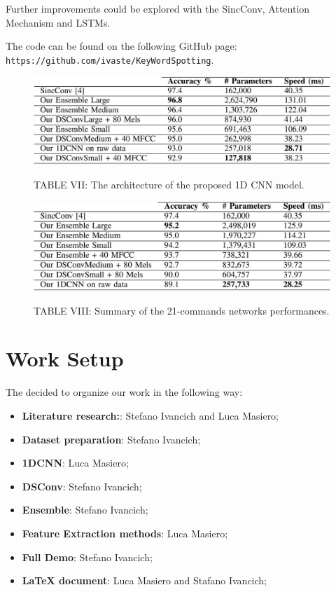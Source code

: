 \documentclass[conference]{IEEEtran}
\begin{document}
Further improvements could be explored with the SincConv, Attention Mechanism and LSTMs.

The code can be found on the following GitHub page: \texttt{https://github.com/ivaste/KeyWordSpotting}.

\begin{figure}
\centering
\includegraphics[scale=0.3]{tab1}
\begin{center}
TABLE VII: The architecture of the proposed 1D CNN model.
\end{center}
\end{figure}

\begin{figure}
\centering
\includegraphics[scale=0.3]{tab2}
\begin{center}
TABLE VIII: Summary of the 21-commands networks performances.
\end{center}
\end{figure}

\newpage
\section*{Work Setup}
The decided to organize our work in the following way:
\begin{itemize}
\item \textbf{Literature research:}: Stefano Ivancich and Luca Masiero;
\item \textbf{Dataset preparation}: Stefano Ivancich;
\item \textbf{1DCNN}: Luca Masiero;
\item \textbf{DSConv}: Stefano Ivancich;
\item \textbf{Ensemble}: Stefano Ivancich;
\item \textbf{Feature Extraction methods}: Luca Masiero;
\item \textbf{Full Demo}: Stefano Ivancich;
\item \textbf{\LaTeX\xspace document}: Luca Masiero and Stafano Ivancich;
\end{itemize}
\end{document}
